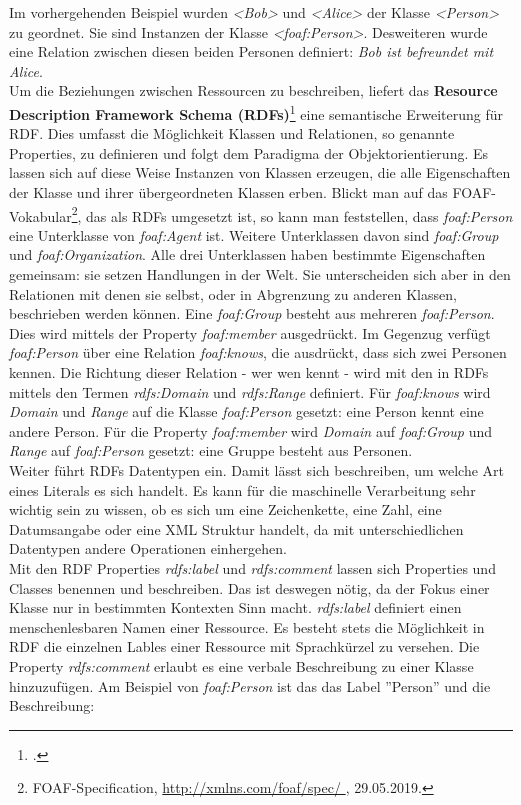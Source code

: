 \documentclass[12pt,a4paper]{article}
\begin{document}
Im vorhergehenden Beispiel wurden \textit{<Bob>} und \textit{<Alice>} der Klasse \textit{<Person>} zu geordnet. Sie sind Instanzen der Klasse \textit{<foaf:Person>}. Desweiteren wurde eine Relation zwischen diesen beiden Personen definiert: \textit{Bob ist befreundet mit Alice}.
\\
Um die Beziehungen zwischen Ressourcen zu beschreiben, liefert das \textbf{Resource Description Framework Schema (RDFs)}\footcite[][]{brickley2014rdf} eine semantische Erweiterung für RDF. Dies umfasst die Möglichkeit Klassen und Relationen, so genannte Properties, zu definieren und folgt dem Paradigma der Objektorientierung. Es lassen sich auf diese Weise Instanzen von Klassen erzeugen, die alle Eigenschaften der Klasse und ihrer übergeordneten Klassen erben. Blickt man auf das FOAF-Vokabular\footnote{FOAF-Specification, \protect\url{http://xmlns.com/foaf/spec/ }, 29.05.2019.}, das als RDFs umgesetzt ist, so kann man feststellen, dass \textit{foaf:Person} eine Unterklasse von \textit{foaf:Agent} ist. Weitere Unterklassen davon sind \textit{foaf:Group} und \textit{foaf:Organization}. Alle drei Unterklassen haben bestimmte Eigenschaften gemeinsam: sie setzen Handlungen in der Welt. Sie unterscheiden sich aber in den Relationen mit denen sie selbst, oder in Abgrenzung zu anderen Klassen, beschrieben werden können. Eine \textit{foaf:Group} besteht aus mehreren \textit{foaf:Person}. Dies wird mittels der Property \textit{foaf:member} ausgedrückt. Im Gegenzug verfügt \textit{foaf:Person} über eine Relation \textit{foaf:knows}, die ausdrückt, dass sich zwei Personen kennen. Die Richtung dieser Relation - wer wen kennt - wird mit den in RDFs mittels den Termen \textit{rdfs:Domain} und \textit{rdfs:Range} definiert. 
Für \textit{foaf:knows} wird \textit{Domain} und \textit{Range} auf die Klasse\textit{ foaf:Person} gesetzt: eine Person kennt eine andere Person. Für die Property \textit{foaf:member} wird \textit{Domain} auf \textit{foaf:Group} und \textit{Range} auf \textit{foaf:Person} gesetzt: eine Gruppe besteht aus Personen.
\\
Weiter führt RDFs Datentypen ein. Damit lässt sich beschreiben, um welche Art eines Literals es sich handelt. Es kann für die maschinelle Verarbeitung sehr wichtig sein zu wissen, ob es sich um eine Zeichenkette, eine Zahl, eine Datumsangabe oder eine XML Struktur handelt, da mit unterschiedlichen Datentypen andere Operationen einhergehen. 
\\
Mit den RDF Properties \textit{rdfs:label} und \textit{rdfs:comment} lassen sich Properties und Classes benennen und beschreiben. Das ist deswegen nötig, da der Fokus einer Klasse nur in bestimmten Kontexten Sinn macht. \textit{rdfs:label} definiert einen menschenlesbaren Namen einer Ressource. Es besteht stets die Möglichkeit in RDF die einzelnen Lables einer Ressource mit Sprachkürzel zu versehen. Die Property \textit{rdfs:comment} erlaubt es eine verbale Beschreibung zu einer Klasse hinzuzufügen. Am Beispiel von \textit{foaf:Person} ist das das Label ''Person'' und die Beschreibung:\\
\end{document}
